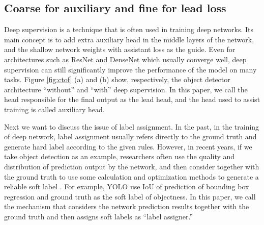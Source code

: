 \documentclass[10pt,twocolumn,letterpaper]{article}
\begin{document}
		
		
		\subsection{Coarse for auxiliary and fine for lead loss}
		
		Deep supervision \cite{lee2015deeply} is a technique that is often used in training deep networks.  Its main concept is to add extra auxiliary head in the middle layers of the network, and the shallow network weights with assistant loss as the guide.  Even for architectures such as ResNet \cite{he2016deep} and DenseNet \cite{huang2017densely} which usually converge well, deep supervision \cite{szegedy2015going, zhou2018unetpp, shen2019object, liang2021cbnetv2, wang2021end, roh2021sparse, yang20213d, liu2021yolostereo3d} can still significantly improve the performance of the model on many tasks.  Figure \ref{fig:ctof} (a) and (b) show, respectively, the object detector architecture ``without'' and ``with'' deep supervision.  In this paper, we call the head responsible for the final output as the lead head, and the head used to assist training is called auxiliary head.
		
		Next we want to discuss the issue of label assignment.  In the past, in the training of deep network, label assignment usually refers directly to the ground truth and generate hard label according to the given rules.  However, in recent years, if we take object detection as an example, researchers often use the quality and distribution of prediction output by the network, and then consider together with the ground truth to use some calculation and optimization methods to generate a reliable soft label \cite{redmon2016you, choi2019gaussian, kim2020probabilistic, zhu2020autoassign, zhang2020bridging, li2020generalized, li2021generalized, zhang2021varifocalnet, ge2021ota, feng2021tood, li2022dual}. For example, YOLO \cite{redmon2016you} use IoU of prediction of bounding box regression and ground truth as the soft label of objectness.  In this paper, we call the mechanism that considers the network prediction results together with the ground truth and then assigns soft labels as ``label assigner.''
		
\end{document}

